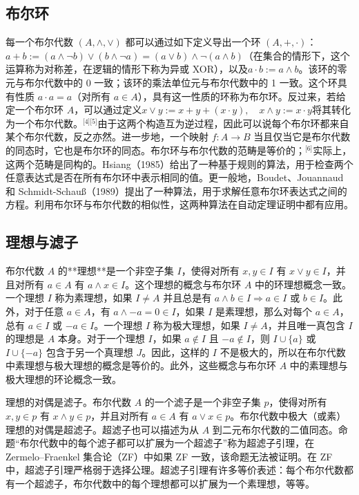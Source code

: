 \subsection{布尔环}
每一个布尔代数 $(A, \land, \lor)$ 都可以通过如下定义导出一个环 $(A, +, \cdot)$：$a + b := (a \land \lnot b) \lor (b \land \lnot a) = (a \lor b) \land \lnot(a \land b)$（在集合的情形下，这个运算称为对称差，在逻辑的情形下称为异或 XOR），以及$a \cdot b := a \land b$。该环的零元与布尔代数中的 0 一致；该环的乘法单位元与布尔代数中的 1 一致。这个环具有性质 $a \cdot a = a$（对所有 $a \in A$），具有这一性质的环称为布尔环。反过来，若给定一个布尔环 $A$，可以通过定义$x \lor y := x + y + (x \cdot y),\quad x \land y := x \cdot y$将其转化为一个布尔代数。\(^\text{[4][5]}\)由于这两个构造互为逆过程，因此可以说每个布尔环都来自某个布尔代数，反之亦然。进一步地，一个映射 $f : A \to B$ 当且仅当它是布尔代数的同态时，它也是布尔环的同态。布尔环与布尔代数的范畴是等价的；\(^\text{[6]}\)实际上，这两个范畴是同构的。Hsiang（1985）给出了一种基于规则的算法，用于检查两个任意表达式是否在所有布尔环中表示相同的值。更一般地，Boudet、Jouannaud 和 Schmidt-Schauß（1989）提出了一种算法，用于求解任意布尔环表达式之间的方程。利用布尔环与布尔代数的相似性，这两种算法在自动定理证明中都有应用。
\subsection{理想与滤子}
布尔代数 $A$ 的**理想**是一个非空子集 $I$，使得对所有 $x, y \in I$ 有 $x \lor y \in I$，并且对所有 $a \in A$ 有 $a \land x \in I$。这个理想的概念与布尔环 $A$ 中的环理想概念一致。一个理想 $I$ 称为素理想，如果 $I \neq A$ 并且总是有 $a \land b \in I \Rightarrow a \in I$ 或 $b \in I$。此外，对于任意 $a \in A$，有 $a \land -a = 0 \in I$，如果 $I$ 是素理想，那么对每个 $a \in A$，总有 $a \in I$ 或 $-a \in I$。一个理想 $I$ 称为极大理想，如果 $I \neq A$，并且唯一真包含 $I$ 的理想是 $A$ 本身。对于一个理想 $I$，如果 $a \notin I$ 且 $-a \notin I$，则 $I \cup \{a\}$ 或 $I \cup \{-a\}$ 包含于另一个真理想 $J$。因此，这样的 $I$ 不是极大的，所以在布尔代数中素理想与极大理想的概念是等价的。此外，这些概念与布尔环 $A$ 中的素理想与极大理想的环论概念一致。

理想的对偶是滤子。布尔代数 $A$ 的一个滤子是一个非空子集 $p$，使得对所有 $x, y \in p$ 有 $x \land y \in p$，并且对所有 $a \in A$ 有 $a \lor x \in p$。布尔代数中极大（或素）理想的对偶是超滤子。超滤子也可以描述为从 $A$ 到二元布尔代数的二值同态。命题“布尔代数中的每个滤子都可以扩展为一个超滤子”称为超滤子引理，在 Zermelo–Fraenkel 集合论（ZF）中如果 ZF 一致，该命题无法被证明。在 ZF 中，超滤子引理严格弱于选择公理。超滤子引理有许多等价表述：每个布尔代数都有一个超滤子，布尔代数中的每个理想都可以扩展为一个素理想，等等。
